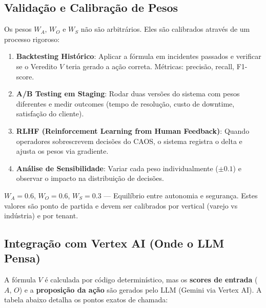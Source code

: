 \documentclass[12pt, a4paper]{article}
\begin{document}
\subsection{Validação e Calibração de Pesos}

Os pesos $W_A$, $W_O$ e $W_S$ não são arbitrários. Eles são calibrados através de um processo rigoroso:

\begin{enumerate}
    \item \textbf{Backtesting Histórico}: Aplicar a fórmula em incidentes passados e verificar se o Veredito $V$ teria gerado a ação correta. Métricas: precisão, recall, F1-score.
    \item \textbf{A/B Testing em Staging}: Rodar duas versões do sistema com pesos diferentes e medir outcomes (tempo de resolução, custo de downtime, satisfação do cliente).
    \item \textbf{RLHF (Reinforcement Learning from Human Feedback)}: Quando operadores sobrescrevem decisões do CAOS, o sistema registra o delta e ajusta os pesos via gradiente.
    \item \textbf{Análise de Sensibilidade}: Variar cada peso individualmente ($\pm 0.1$) e observar o impacto na distribuição de decisões.
\end{enumerate}

\begin{notabox}
$W_A = 0.6$, $W_O = 0.6$, $W_S = 0.3$ — Equilíbrio entre autonomia e segurança. Estes valores são ponto de partida e devem ser calibrados por vertical (varejo vs indústria) e por tenant.
\end{notabox}

\subsection{Integração com Vertex AI (Onde o LLM Pensa)}

A fórmula $V$ é calculada por código determinístico, mas os \textbf{scores de entrada} ($A$, $O$) e a \textbf{proposição da ação} são gerados pelo LLM (Gemini via Vertex AI). A tabela abaixo detalha os pontos exatos de chamada:
\end{document}

